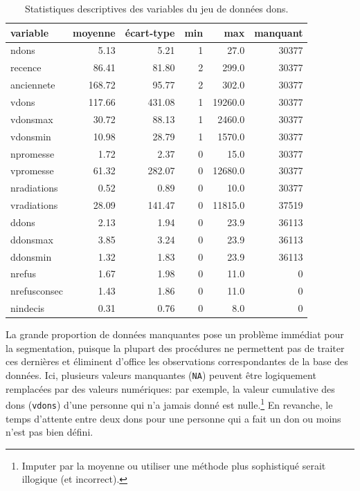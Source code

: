 \documentclass[
  11pt,
  letterpaper,
]{book}
\theoremstyle{definition}
\theoremstyle{remark}
\begin{document}
\hypertarget{tbl-statdescriptdons}{}
\begin{table}
\caption{\label{tbl-statdescriptdons}Statistiques descriptives des variables du jeu de données dons. }\tabularnewline

\centering
\begin{tabular}{lrrrrr}
\toprule
variable & moyenne & écart-type & min & max & manquant\\
\midrule
ndons & 5.13 & 5.21 & 1 & 27.0 & 30377\\
recence & 86.41 & 81.80 & 2 & 299.0 & 30377\\
anciennete & 168.72 & 95.77 & 2 & 302.0 & 30377\\
vdons & 117.66 & 431.08 & 1 & 19260.0 & 30377\\
vdonsmax & 30.72 & 88.13 & 1 & 2460.0 & 30377\\
\addlinespace
vdonsmin & 10.98 & 28.79 & 1 & 1570.0 & 30377\\
npromesse & 1.72 & 2.37 & 0 & 15.0 & 30377\\
vpromesse & 61.32 & 282.07 & 0 & 12680.0 & 30377\\
nradiations & 0.52 & 0.89 & 0 & 10.0 & 30377\\
vradiations & 28.09 & 141.47 & 0 & 11815.0 & 37519\\
\addlinespace
ddons & 2.13 & 1.94 & 0 & 23.9 & 36113\\
ddonsmax & 3.85 & 3.24 & 0 & 23.9 & 36113\\
ddonsmin & 1.32 & 1.83 & 0 & 23.9 & 36113\\
nrefus & 1.67 & 1.98 & 0 & 11.0 & 0\\
nrefusconsec & 1.43 & 1.86 & 0 & 11.0 & 0\\
\addlinespace
nindecis & 0.31 & 0.76 & 0 & 8.0 & 0\\
\bottomrule
\end{tabular}
\end{table}

La grande proportion de données manquantes pose un problème immédiat
pour la segmentation, puisque la plupart des procédures ne permettent
pas de traiter ces dernières et éliminent d'office les observations
correspondantes de la base des données. Ici, plusieurs valeurs
manquantes (\texttt{NA}) peuvent être logiquement remplacées par des
valeurs numériques: par exemple, la valeur cumulative des dons
(\texttt{vdons}) d'une personne qui n'a jamais donné est
nulle.\footnote{Imputer par la moyenne ou utiliser une méthode plus
  sophistiqué serait illogique (et incorrect).} En revanche, le temps
d'attente entre deux dons pour une personne qui a fait un don ou moins
n'est pas bien défini.
\end{document}
